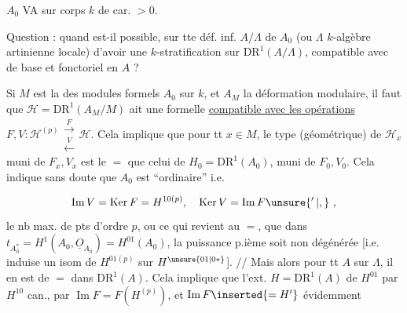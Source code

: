 $A_0$ VA sur corps $k$ de car. $>0$.

Question : quand est-il possible, sur tte déf. inf. $A/\Lambda$ de $A_0$
(ou $\Lambda$ $k$-algèbre artinienne locale) d'avoir une
$k$-stratification sur $\mathrm{DR}^1(A/\Lambda)$, compatible avec
 de base et fonctoriel en $A$ ?

Si $M$ est la  des modules formels  $A_0$ sur $k$,
 et $A_M$ la déformation modulaire, il
faut que $\mathscr H=\mathrm{DR}^1(A_M/M)$ ait une  formelle
\uline{compatible avec les opérations} $F,V:\mathscr H^{(p)}\mathrel{\substack{\xrightarrow{F}\\[-.5ex]\xleftarrow{V}}}\mathscr H$. Cela
implique que pour tt $x\in M$, le type (géométrique) de $\mathscr H_x$ muni de $F_x,V_x$ est le $=$ que
celui de $H_0=\mathrm{DR}^1(A_0)$, muni de $F_0,V_0$. Cela
indique sans doute que $A_0$ est ``ordinaire'' i.e.

\[
\operatorname{Im}V=\operatorname{Ker}F=H^{10(p)},\quad
\operatorname{Ker}V=\operatorname{Im}F\unsure{'\,|,}\ ,
\]
 le nb max. de pts d'ordre $p$, ou ce qui revient
au $=$, que dans $t_{A_0^*}=H^1(A_0,\underline O_{A_0})
=H^{01}(A_0)$, la puissance p.ième
soit non dégénérée [i.e. induise un isom de
$H^{01(p)}$ sur $H^{\unsure{01|0*}}$]. // Mais alors  pour tt $A$ sur $\Lambda$,
il en est de $=$ dans $\mathrm{DR}^1(A)$. Cela implique
que l'ext. $H=\mathrm{DR}^1(A)$ de $H^{01}$ par $H^{10}$  can.,
par $\operatorname{Im} F=F(H^{(p)})$, et  $\operatorname{Im} F\inserted{=H'}$  évidemment

